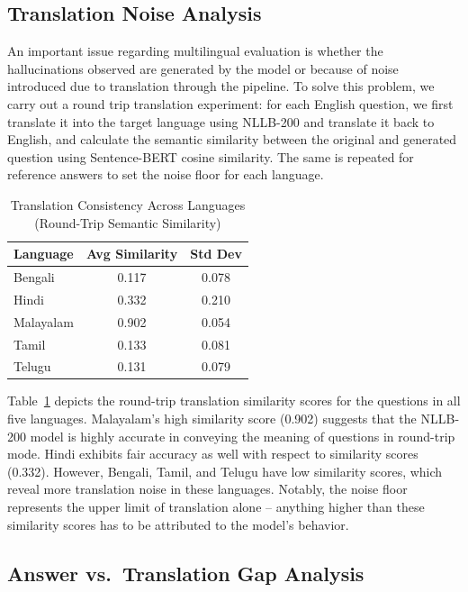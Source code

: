 \documentclass[conference]{IEEEtran}
\begin{document}
\subsection{Translation Noise Analysis}

An important issue regarding multilingual evaluation is whether the hallucinations 
observed are generated by the model or because of noise introduced 
due to translation through the pipeline. To solve this problem, we carry out 
a round trip translation experiment: for each English question, we first translate 
it into the target language using NLLB-200 and translate it back to English, 
and calculate the semantic similarity between the original and generated 
question using Sentence-BERT cosine similarity. The same is repeated for 
reference answers to set the noise floor for each language.

\begin{table}[h]
\centering
\caption{Translation Consistency Across Languages (Round-Trip 
Semantic Similarity)}
\label{tab:translation_noise}
\begin{tabular}{lcc}
\hline
\textbf{Language} & \textbf{Avg Similarity} & \textbf{Std Dev} \\
\hline
Bengali   & 0.117 & 0.078 \\
Hindi     & 0.332 & 0.210 \\
Malayalam & 0.902 & 0.054 \\
Tamil     & 0.133 & 0.081 \\
Telugu    & 0.131 & 0.079 \\
\hline
\end{tabular}
\end{table}

Table~\ref{tab:translation_noise} depicts the round-trip translation
similarity scores for the questions in all five languages. 
Malayalam’s high similarity score (0.902) suggests that the 
NLLB-200 model is highly accurate in conveying the meaning of 
questions in round-trip mode. Hindi exhibits fair accuracy as well 
with respect to similarity scores (0.332). However, Bengali, Tamil,
and Telugu have low similarity scores, which reveal more 
translation noise in these languages. Notably, the noise floor 
represents the upper limit of translation alone – anything higher 
than these similarity scores has to be attributed to the model’s 
behavior.

\subsection{Answer vs.\ Translation Gap Analysis}
\end{document}
